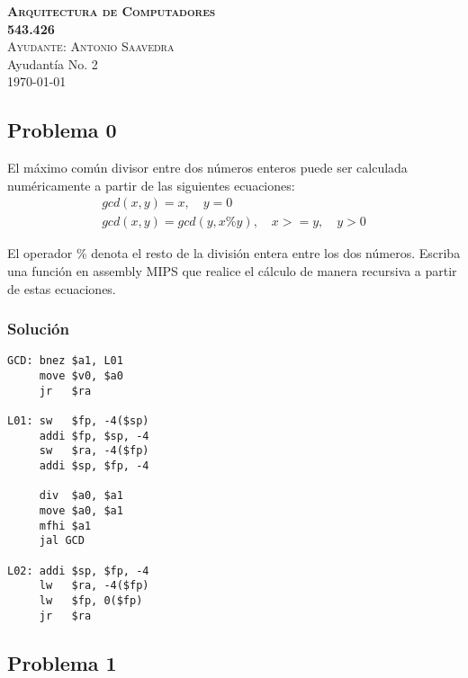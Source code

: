 \documentclass[letterpaper,11pt,notitlepage]{article}
\begin{document}

\begin{center}
\textsc{ \huge \bfseries Arquitectura de Computadores\\[0.2cm] 543.426}\\[0.2cm]
\textsc{ Ayudante: Antonio Saavedra}\\[0.2cm]
Ayudantía No. 2\\

\today

\end{center}




\subsection*{Problema 0}
El máximo común divisor entre dos números enteros puede ser calculada numéricamente a partir de las siguientes ecuaciones:
\begin{eqnarray*}
gcd(x,y) = x, \quad y = 0\\
gcd(x,y) = gcd(y,x\%y), \quad x>=y, \quad y>0
\end{eqnarray*}

El operador \% denota el resto de la división entera entre los dos números. Escriba una función en assembly MIPS que realice el cálculo de manera recursiva a partir de estas ecuaciones.
\subsubsection*{Solución}

\begin{lstlisting}[style=C]
GCD: bnez $a1, L01
     move $v0, $a0
     jr   $ra
     
L01: sw   $fp, -4($sp)
     addi $fp, $sp, -4
     sw   $ra, -4($fp)
     addi $sp, $fp, -4
     
     div  $a0, $a1
     move $a0, $a1
     mfhi $a1
     jal GCD
     
L02: addi $sp, $fp, -4
     lw   $ra, -4($fp)
     lw   $fp, 0($fp)
     jr   $ra
\end{lstlisting}
      

\newpage
\subsection*{Problema 1}
\end{document}
